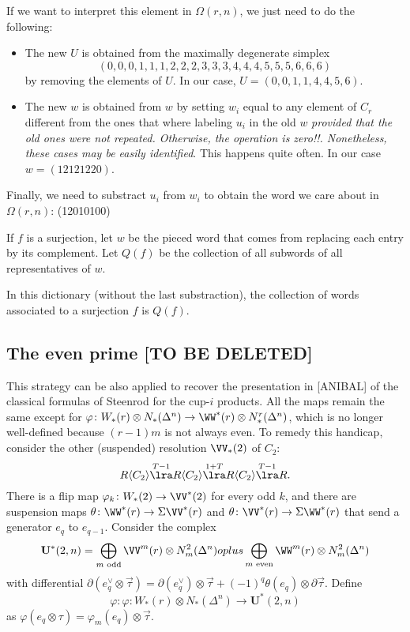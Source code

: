 If we want to interpret this element in $\Omega(r,n)$, we just need to do the following:
\begin{itemize}
	\item The new $U$ is obtained from the maximally degenerate simplex \[(0,0,0,1,1,1,2,2,2,3,3,3,4,4,4,5,5,5,6,6,6)\] by removing the elements of $U$. In our case, $U=(0,0,1,1,4,4,5,6)$.
	\item The new $w$ is obtained from $w$ by setting $w_i$ equal to any element of $C_r$ different from the ones that where labeling $u_i$ in the old $w$ \emph{provided that the old ones were not repeated. Otherwise, the operation is zero!!. Nonetheless, these cases may be easily identified}. This happens quite often. In our case $w=(12121220)$.
\end{itemize}
Finally, we need to substract $u_i$ from $w_i$ to obtain the word we care about in $\Omega(r,n)$: (12010100)

If $f$ is a surjection, let $w$ be the pieced word that comes from replacing each entry by its complement. Let $Q(f)$ be the collection of all subwords of all representatives of $w$.
\begin{lemma} In this dictionary (without the last substraction), the collection of words associated to a surjection $f$ is $Q(f)$.
\end{lemma}

\subsection{The even prime [TO BE DELETED]} This strategy can be also applied to recover the presentation in [ANIBAL] of the classical formulas of Steenrod for the cup-$i$ products. All the maps remain the same except for $\varphi\colon W_*(r)\otimes N_*(\Delta^n)\to \WW^*(r)\otimes N^r_*(\Delta^n)$, which is no longer well-defined because $(r-1)m$ is not always even. To remedy this handicap, consider the other (suspended) resolution $\VV_*(2)$ of $C_2$:
\[R\langle C_2\rangle \overset{T-1}{\lra} R\langle C_2\rangle \overset{1+T}{\lra} R\langle C_2\rangle \overset{T-1}{\lra} R.\]
There is a flip map $\varphi_k\colon W_*(2)\to \VV^*(2)$ for every odd $k$, and there are suspension maps $\theta\colon \WW^*(r)\to \Sigma \VV^*(r)$ and $\theta\colon \VV^*(r)\to \Sigma \WW^*(r)$ that send a generator $e_q$ to $e_{q-1}$. Consider the complex
\[\mathbf{U}^*(2,n) = \bigoplus_{m\text{ odd}} \VV^m(r)\otimes N^2_m(\Delta^n)
oplus
\bigoplus_{m\text{ even}} \WW^m(r)\otimes N^2_m(\Delta^n)
\]
with differential $\partial(e_q^\vee\otimes \vec{\tau}) = \partial(e_q^\vee)\otimes \vec{\tau} + (-1)^q \theta(e_q)\otimes \partial \vec{\tau}$. Define
\[\varphi\colon \varphi\colon W_*(r)\otimes N_*(\Delta^n)\to 
\mathbf{U}^*(2,n)\]
as $\varphi(e_q\otimes \tau) = \varphi_m(e_q)\otimes \vec{\tau}$.

